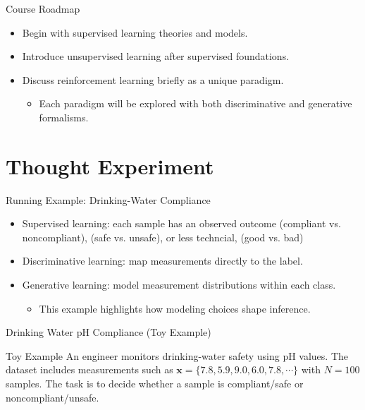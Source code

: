 \documentclass[10pt]{beamer}
\begin{document}
\begin{frame}{Course Roadmap}
    \justifying
    \begin{itemize}
        \item Begin with supervised learning theories and models.
        \item Introduce unsupervised learning after supervised foundations.
        \item Discuss reinforcement learning briefly as a unique paradigm.
        \begin{itemize}
            \item Each paradigm will be explored with both discriminative and generative formalisms.
        \end{itemize}
    \end{itemize}
\end{frame}
\section{Thought Experiment}

\begin{frame}{Running Example: Drinking-Water Compliance}
    \justifying
    \begin{itemize}
        \item Supervised learning: each sample has an observed outcome (compliant vs. noncompliant), (safe vs. unsafe), or less techncial, (good vs. bad)
        \item Discriminative learning: map measurements directly to the label.
        \item Generative learning: model measurement distributions within each class.
        \begin{itemize}
            \item This example highlights how modeling choices shape inference.
        \end{itemize}
    \end{itemize}
\end{frame}

\begin{frame}{Drinking Water pH Compliance (Toy Example)}
    \justifying
    \begin{examplebox}{Toy Example}
        An engineer monitors drinking-water safety using pH values.
        The dataset includes measurements such as
        $\bm{x} = \{7.8, 5.9, 9.0, 6.0, 7.8, \cdots\}$ with $N = 100$ samples.
        The task is to decide whether a sample is compliant/safe or noncompliant/unsafe.
    \end{examplebox}
\end{frame}
\end{document}
